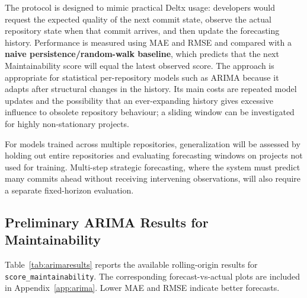 \documentclass[12pt,a4paper,oneside]{report}
\newcommand{\code}[1]{\nolinkurl{#1}}
\begin{document}
The protocol is designed to mimic practical Deltx usage: developers would request the expected quality of the next commit state, observe the actual repository state when that commit arrives, and then update the forecasting history. Performance is measured using MAE and RMSE and compared with a \textbf{naive persistence/random-walk baseline}, which predicts that the next Maintainability score will equal the latest observed score. The approach is appropriate for statistical per-repository models such as ARIMA because it adapts after structural changes in the history. Its main costs are repeated model updates and the possibility that an ever-expanding history gives excessive influence to obsolete repository behaviour; a sliding window can be investigated for highly non-stationary projects.

For models trained across multiple repositories, generalization will be assessed by holding out entire repositories and evaluating forecasting windows on projects not used for training. Multi-step strategic forecasting, where the system must predict many commits ahead without receiving intervening observations, will also require a separate fixed-horizon evaluation.

\subsection{Preliminary ARIMA Results for Maintainability}
Table~\ref{tab:arimaresults} reports the available rolling-origin results for \code{score\_maintainability}. The corresponding forecast-vs-actual plots are included in Appendix~\ref{app:arima}. Lower MAE and RMSE indicate better forecasts.
\end{document}
